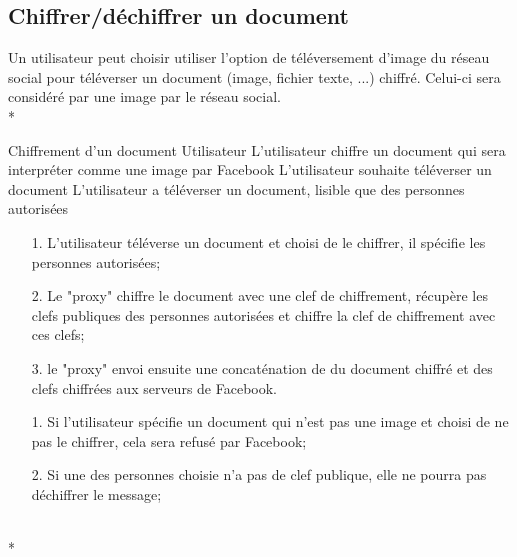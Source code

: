 \documentclass[a4paper,11pt,french]{article}
\begin{document}
\subsection{Chiffrer/déchiffrer un document}
Un utilisateur peut choisir utiliser l'option de téléversement
d'image du réseau social pour téléverser un document (image, 
fichier texte, ...) chiffré. Celui-ci sera considéré par une image
par le réseau social.\\*

\fiche
	{Chiffrement d'un document}
	{Utilisateur}
	{L'utilisateur chiffre un document qui sera interpréter comme une image 
        par Facebook}
	{}
	{L'utilisateur souhaite téléverser un document}
	{L'utilisateur a téléverser un document, lisible que des personnes 
        autorisées}
	{\begin{itemize}
	    \item[]
	  \item[1.] L'utilisateur téléverse un document et choisi de le chiffrer,
          il spécifie les personnes autorisées;
	\end{itemize}
	}
	{\begin{itemize}
        \item[]
		\item[2.] Le "proxy" chiffre le document avec une clef 
        de chiffrement, récupère les clefs publiques
        des personnes autorisées et chiffre la clef de chiffrement
        avec ces clefs;
		\item[3.] le "proxy" envoi ensuite une concaténation de 
        du document chiffré et des clefs chiffrées aux serveurs de Facebook.
	\end{itemize}
	}
	{}
\flots
    {\begin{itemize}
    \item[]
    \item[1.] Si l'utilisateur spécifie un document qui n'est pas une image
    et choisi de ne pas le chiffrer, cela sera refusé par Facebook;
    \item[2.] Si une des personnes choisie n'a pas de clef publique,
        elle ne pourra pas déchiffrer le message;
    \end{itemize}
    }
	{}    
\\*
\end{document}
